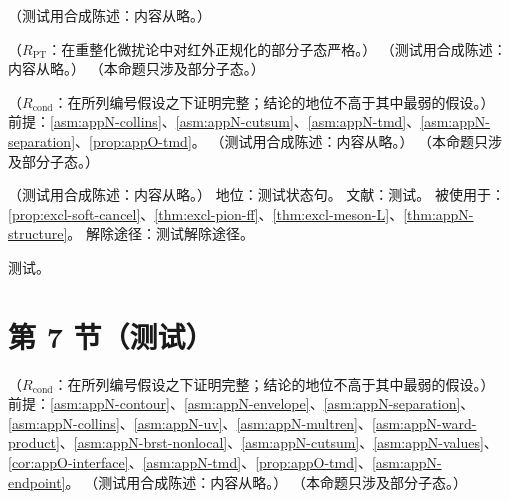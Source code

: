 \begin{remark}[类空正规子线的自能]\label{rem:appN-spacelike-selfenergy}
（测试用合成陈述：内容从略。）
\end{remark}

\begin{lemma}\label{lem:appN-absorption}
（$R_{\mathrm{PT}}$：在重整化微扰论中对红外正规化的部分子态严格。）
（测试用合成陈述：内容从略。）
（本命题只涉及部分子态。）
\end{lemma}

\begin{proposition}\label{prop:appN-tmd-window}
（$R_{\mathrm{cond}}$：在所列编号假设之下证明完整；结论的地位不高于其中最弱的假设。）
前提：\cref{asm:appN-collins}、\cref{asm:appN-cutsum}、\cref{asm:appN-tmd}、\cref{asm:appN-separation}、\cref{prop:appO-tmd}。
（测试用合成陈述：内容从略。）
（本命题只涉及部分子态。）
\end{proposition}

\begin{assumption}\label{asm:appN-endpoint}
（测试用合成陈述：内容从略。）
地位：测试状态句。
文献：测试。
被使用于：\cref{prop:excl-soft-cancel}、\cref{thm:excl-pion-ff}、\cref{thm:excl-meson-L}、\cref{thm:appN-structure}。
解除途径：测试解除途径。
\end{assumption}
\begin{proofsketch}测试。\end{proofsketch}

\section{第 7 节（测试）}\label{sec:appN-examples}

\begin{theorem}\label{thm:appN-structure}
（$R_{\mathrm{cond}}$：在所列编号假设之下证明完整；结论的地位不高于其中最弱的假设。）
前提：\cref{asm:appN-contour}、\cref{asm:appN-envelope}、\cref{asm:appN-separation}、\cref{asm:appN-collins}、\cref{asm:appN-uv}、\cref{asm:appN-multren}、\cref{asm:appN-ward-product}、\cref{asm:appN-brst-nonlocal}、\cref{asm:appN-cutsum}、\cref{asm:appN-values}、\cref{cor:appO-interface}、\cref{asm:appN-tmd}、\cref{prop:appO-tmd}、\cref{asm:appN-endpoint}。
（测试用合成陈述：内容从略。）
（本命题只涉及部分子态。）
\end{theorem}

